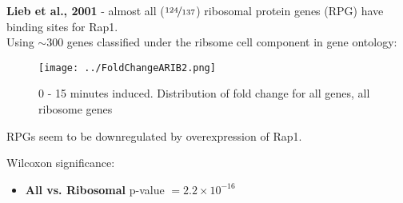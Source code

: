 \documentclass{beamer}
\begin{document}


\begin{frame}
    \textbf{Lieb et al., 2001} - almost all ($\nicefrac{124}{137}$) ribosomal protein genes (RPG) have binding sites for Rap1.\\

{ \scriptsize Using $\sim 300$ genes classified under the ribsome cell component in gene ontology:}
    \begin{figure}[ht!]
            \centering
            \texttt{[image: ../FoldChangeARIB2.png]}
            \caption{0 - 15 minutes induced. Distribution of fold change for {\color{gray} all genes}, {\color{blue} all ribosome genes}}
            \label{fig:all.rib}
        \end{figure}

        RPGs seem to be downregulated by overexpression of Rap1.

 Wilcoxon significance:
    \begin{itemize}
        \item \textbf{All vs. Ribosomal} p-value $= 2.2 \times 10^{-16}$
    \end{itemize}
\end{frame}
\end{document}
